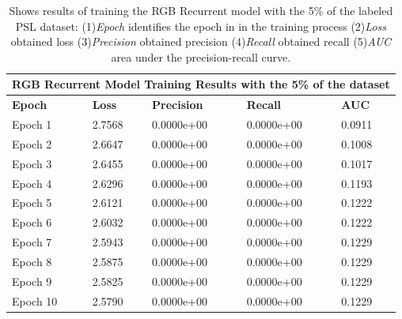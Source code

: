 \documentclass[twocolumn,conference]{article}
\begin{document}
\begin{table}
\captionsetup{font=footnotesize}
\centering
\begin{tabular}{ p{2.8cm} p{2.8cm} p{2.8cm} p{2.8cm} p{2.8cm} }
\toprule
\multicolumn{5}{c}{\textbf{RGB Recurrent Model Training Results with the 5\% of the dataset}} \\
\hline
\hline
\textbf{Epoch}&	\textbf{Loss}	&\textbf{Precision}	&\textbf{Recall}	&\textbf{AUC} \\
\hline
\midrule
Epoch 1&	2.7568&	0.0000e+00&	0.0000e+00&	0.0911\\
Epoch 2&	2.6647&	0.0000e+00&	0.0000e+00&	0.1008\\
Epoch 3&	2.6455&	0.0000e+00&	0.0000e+00&	0.1017\\
Epoch 4&	2.6296&	0.0000e+00&	0.0000e+00&	0.1193\\
Epoch 5&	2.6121&	0.0000e+00&	0.0000e+00&	0.1222\\
Epoch 6&	2.6032&	0.0000e+00&	0.0000e+00&	0.1222\\
Epoch 7&	2.5943&	0.0000e+00&	0.0000e+00&	0.1229\\
Epoch 8&	2.5875&	0.0000e+00&	0.0000e+00&	0.1229\\
Epoch 9&	2.5825&	0.0000e+00&	0.0000e+00&	0.1229\\
Epoch 10&	2.5790&	0.0000e+00&	0.0000e+00&	0.1229\\
\bottomrule
\end{tabular}
\caption{Shows results of training the RGB Recurrent model with the 5\% of the labeled PSL dataset: (1)\textit{Epoch} identifies the epoch in in the training process (2)\textit{Loss} obtained loss (3)\textit{Precision} obtained precision (4)\textit{Recall} obtained recall (5)\textit{AUC} area under the precision-recall curve.}
\label{tab:rgb-detection-results-5-percent}
\end{table}
\end{document}
